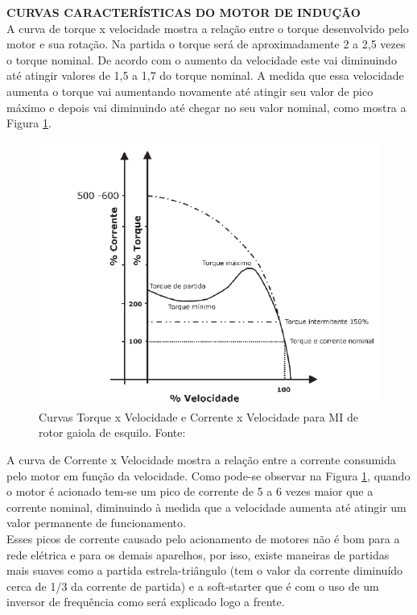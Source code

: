 \textbf{CURVAS CARACTERÍSTICAS DO MOTOR DE INDUÇÃO}\\

A curva de torque x velocidade mostra a relação entre o torque desenvolvido pelo motor e sua rotação. Na partida o torque será de aproximadamente 2 a 2,5 vezes o torque nominal. De acordo com o aumento da velocidade este vai diminuindo até atingir valores de 1,5 a 1,7 do torque nominal.\cite{WEG} A medida que essa velocidade aumenta o torque vai aumentando novamente até atingir seu valor de pico máximo e depois vai diminuindo até chegar no seu 
valor nominal, como mostra a Figura \ref{fig:curvas_motor}.

\begin{figure}[!ht]
\centering
\includegraphics[scale=0.8]{figuras/grafico_motor.png}
\caption{Curvas Torque x Velocidade e Corrente x Velocidade para MI de rotor gaiola de esquilo. Fonte:\cite{WEG}}
\label{fig:curvas_motor}
\end{figure}

A curva de Corrente x Velocidade mostra a relação entre a corrente consumida pelo motor em função da velocidade. Como pode-se observar na Figura \ref{fig:curvas_motor}, quando o motor é acionado tem-se um pico de corrente de 5 a 6 vezes maior que a corrente nominal, diminuindo à medida que a velocidade aumenta até atingir um valor permanente de funcionamento.\\

\text Esses picos de corrente causado pelo acionamento de motores não é bom para a rede elétrica e para os demais aparelhos, por isso, existe maneiras de partidas mais suaves como a partida estrela-triângulo (tem o valor da corrente diminuído cerca de 1/3 da corrente de partida) e a soft-starter que é com o uso de um inversor de frequência como será explicado logo a frente.\\

